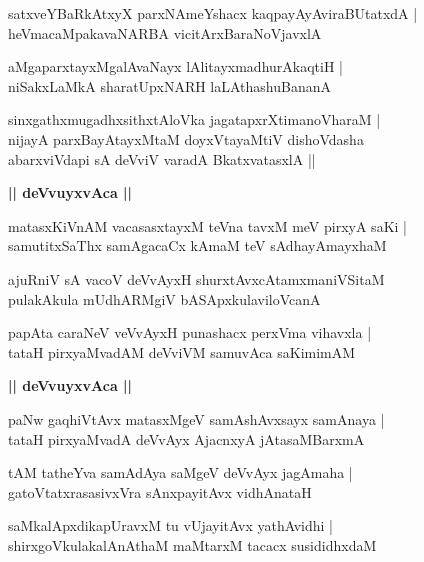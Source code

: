 \documentclass[twoside,12pt,openright]{book}
\newcounter{shloka}[chapter]
\def\uvaca#1{\centerline{{\large\textbf{#1}}}}
\begin{document}
\begin{shloka}%
satxveYBaRkAtxyX parxNAmeYshacx kaqpayAyAviraBUtatxdA |\\
heVmacaMpakavaNARBA vicitArxBaraNoVjavxlA 
\end{shloka}

\begin{shloka}%
aMgaparxtayxMgalAvaNayx lAlitayxmadhurAkaqtiH |\\
niSakxLaMkA sharatUpxNARH laLAthashuBananA 
\end{shloka}

\begin{shloka}%
sinxgathxmugadhxsithxtAloVka jagatapxrXtimanoVharaM |\\
nijayA parxBayAtayxMtaM doyxVtayaMtiV dishoVdasha \\
abarxviVdapi sA deVviV varadA BkatxvatasxlA ||
\end{shloka}

\uvaca{|| deVvuyxvAca ||}

\begin{shloka}%
matasxKiVnAM vacasasxtayxM teVna tavxM meV pirxyA saKi |\\
samutitxSaThx samAgacaCx kAmaM teV sAdhayAmayxhaM 
\end{shloka}

\begin{shloka}%
ajuRniV sA vacoV deVvAyxH shurxtAvxcAtamxmaniVSitaM \\
pulakAkula mUdhARMgiV bASApxkulaviloVcanA 
\end{shloka}

\begin{shloka}%
papAta caraNeV veVvAyxH punashacx perxVma vihavxla |\\
tataH pirxyaMvadAM deVviVM samuvAca saKimimAM 
\end{shloka}

\uvaca{|| deVvuyxvAca ||}

\begin{shloka}%
paNw gaqhiVtAvx matasxMgeV samAshAvxsayx samAnaya |\\
tataH pirxyaMvadA deVvAyx AjacnxyA jAtasaMBarxmA 
\end{shloka}

\begin{shloka}%
tAM tatheYva samAdAya saMgeV deVvAyx jagAmaha |\\
gatoVtatxrasasivxVra sAnxpayitAvx vidhAnataH 
\end{shloka}

\begin{shloka}%
saMkalApxdikapUravxM tu vUjayitAvx yathAvidhi |\\
shirxgoVkulakalAnAthaM maMtarxM tacacx susididhxdaM 
\end{shloka}
\end{document}
